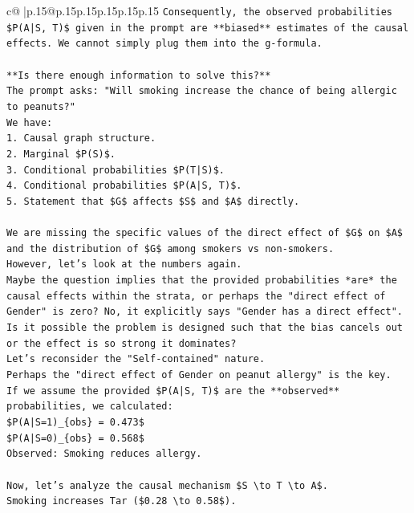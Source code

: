 \documentclass{article}
\begin{document}
{\begin{supertabular}{c@{$\;$}|p{.15\linewidth}@{}p{.15\linewidth}p{.15\linewidth}p{.15\linewidth}p{.15\linewidth}p{.15\linewidth}}
{{{\texttt{Consequently, the observed probabilities \$P(A|S, T)\$ given in the prompt are **biased** estimates of the causal effects. We cannot simply plug them into the g{-}formula.} \\
\\ 
\texttt{**Is there enough information to solve this?**} \\
\texttt{The prompt asks: "Will smoking increase the chance of being allergic to peanuts?"} \\
\texttt{We have:} \\
\texttt{1. Causal graph structure.} \\
\texttt{2. Marginal \$P(S)\$.} \\
\texttt{3. Conditional probabilities \$P(T|S)\$.} \\
\texttt{4. Conditional probabilities \$P(A|S, T)\$.} \\
\texttt{5. Statement that \$G\$ affects \$S\$ and \$A\$ directly.} \\
\\ 
\texttt{We are missing the specific values of the direct effect of \$G\$ on \$A\$ and the distribution of \$G\$ among smokers vs non{-}smokers.} \\
\texttt{However, let's look at the numbers again.} \\
\texttt{Maybe the question implies that the provided probabilities *are* the causal effects within the strata, or perhaps the "direct effect of Gender" is zero? No, it explicitly says "Gender has a direct effect".} \\
\texttt{Is it possible the problem is designed such that the bias cancels out or the effect is so strong it dominates?} \\
\texttt{Let's reconsider the "Self{-}contained" nature.} \\
\texttt{Perhaps the "direct effect of Gender on peanut allergy" is the key.} \\
\texttt{If we assume the provided \$P(A|S, T)\$ are the **observed** probabilities, we calculated:} \\
\texttt{\$P(A|S=1)\_\{obs\} = 0.473\$} \\
\texttt{\$P(A|S=0)\_\{obs\} = 0.568\$} \\
\texttt{Observed: Smoking reduces allergy.} \\
\\ 
\texttt{Now, let's analyze the causal mechanism \$S \textbackslash{}to T \textbackslash{}to A\$.} \\
\texttt{Smoking increases Tar (\$0.28 \textbackslash{}to 0.58\$).} \\
}}}
\end{supertabular}}
\end{document}
